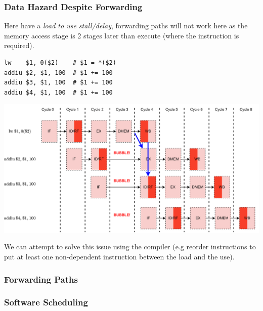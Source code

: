 \subsubsection{Data Hazard Despite Forwarding}
Here have a \textit{load to use stall/delay}, forwarding paths will not work here as the memory access stage is 2 stages later than execute (where the instruction is required).
\begin{verbatim}
lw    $1, 0($2)    # $1 = *($2)
addiu $2, $1, 100  # $1 += 100 
addiu $3, $1, 100  # $1 += 100
addiu $4, $1, 100  # $1 += 100
\end{verbatim}
\begin{center}
	\includegraphics[width=.9\textwidth]{pipelining/images/pipeline_operand_forward_3.drawio.png}
\end{center}
We can attempt to solve this issue using the compiler (e.g reorder instructions to put at least one non-dependent instruction between the load and the use).
\subsubsection{Forwarding Paths}
\subsubsection{Software Scheduling}


